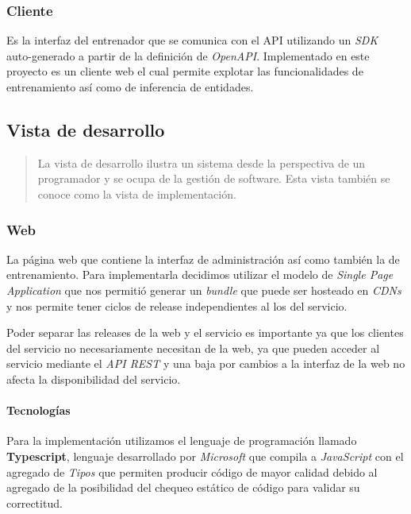 \documentclass[12pt,a4paper,]{scrartcl}
\let\oldparagraph\paragraph
\renewcommand{\paragraph}[1]{\oldparagraph{#1}\mbox{}}
\begin{document}
\hypertarget{cliente}{%
\subsubsection{Cliente}\label{cliente}}

Es la interfaz del entrenador que se comunica con el API utilizando un \emph{SDK} auto-generado a partir de la definición de \emph{OpenAPI}. Implementado en este proyecto es un cliente web el cual permite explotar las funcionalidades de entrenamiento así como de inferencia de entidades.

\hypertarget{vista-de-desarrollo}{%
\subsection{Vista de desarrollo}\label{vista-de-desarrollo}}

\begin{quote}
La vista de desarrollo ilustra un sistema desde la perspectiva de un programador y se ocupa de la gestión de software.
Esta vista también se conoce como la vista de implementación.
\end{quote}

\hypertarget{web-1}{%
\subsubsection{Web}\label{web-1}}

La página web que contiene la interfaz de administración así como también la de entrenamiento. Para implementarla decidimos utilizar el modelo de \emph{Single Page Application} que nos permitió generar un \emph{bundle} que puede ser hosteado en \emph{CDNs} y nos permite tener ciclos de release independientes al los del servicio.

Poder separar las releases de la web y el servicio es importante ya que los clientes del servicio no necesariamente necesitan de la web, ya que pueden acceder al servicio mediante el \emph{API REST} y una baja por cambios a la interfaz de la web no afecta la disponibilidad del servicio.

\hypertarget{tecnologuxedas}{%
\paragraph{Tecnologías}\label{tecnologuxedas}}

Para la implementación utilizamos el lenguaje de programación llamado \textbf{Typescript}, lenguaje desarrollado por \emph{Microsoft} que compila a \emph{JavaScript} con el agregado de \emph{Tipos} que permiten producir código de mayor calidad debido al agregado de la posibilidad del chequeo estático de código para validar su correctitud.
\end{document}
